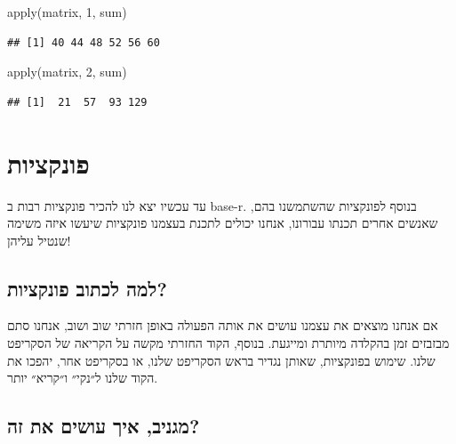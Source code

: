 \documentclass[
]{book}
\newenvironment{Shaded}{\begin{snugshade}}{\end{snugshade}}
\newcommand{\DecValTok}[1]{\textcolor[rgb]{0.00,0.00,0.81}{#1}}
\newcommand{\FunctionTok}[1]{\textcolor[rgb]{0.00,0.00,0.00}{#1}}
\newcommand{\NormalTok}[1]{#1}
\begin{document}
\begin{Shaded}
\begin{Highlighting}[]
\FunctionTok{apply}\NormalTok{(matrix, }\DecValTok{1}\NormalTok{, sum)}
\end{Highlighting}
\end{Shaded}

\begin{verbatim}
## [1] 40 44 48 52 56 60
\end{verbatim}

\begin{Shaded}
\begin{Highlighting}[]
\FunctionTok{apply}\NormalTok{(matrix, }\DecValTok{2}\NormalTok{, sum)}
\end{Highlighting}
\end{Shaded}

\begin{verbatim}
## [1]  21  57  93 129
\end{verbatim}

\hypertarget{ux5e4ux5d5ux5e0ux5e7ux5e6ux5d9ux5d5ux5ea}{%
\chapter{פונקציות}\label{ux5e4ux5d5ux5e0ux5e7ux5e6ux5d9ux5d5ux5ea}}

עד עכשיו יצא לנו להכיר פונקציות רבות ב
base-r.
בנוסף לפונקציות שהשתמשנו בהם, שאנשים אחרים תכנתו עבורונו, אנחנו יכולים לתכנת בעצמנו פונקציות שיעשו איזה משימה שנטיל עליהן!

\hypertarget{ux5dcux5deux5d4-ux5dcux5dbux5eaux5d5ux5d1-ux5e4ux5d5ux5e0ux5e7ux5e6ux5d9ux5d5ux5ea}{%
\section{למה לכתוב פונקציות?}\label{ux5dcux5deux5d4-ux5dcux5dbux5eaux5d5ux5d1-ux5e4ux5d5ux5e0ux5e7ux5e6ux5d9ux5d5ux5ea}}

אם אנחנו מוצאים את עצמנו עושים את אותה הפעולה באופן חזרתי שוב ושוב, אנחנו סתם מבזבזים זמן בהקלדה מיותרת ומייגעת. בנוסף, הקוד החזרתי מקשה על הקריאה של הסקריפט שלנו. שימוש בפונקציות, שאותן נגדיר בראש הסקריפט שלנו, או בסקריפט אחר, יהפכו את הקוד שלנו ל״נקי״ ו״קריא״ יותר.

\hypertarget{ux5deux5d2ux5e0ux5d9ux5d1-ux5d0ux5d9ux5da-ux5e2ux5d5ux5e9ux5d9ux5dd-ux5d0ux5ea-ux5d6ux5d4}{%
\section{מגניב, איך עושים את זה?}\label{ux5deux5d2ux5e0ux5d9ux5d1-ux5d0ux5d9ux5da-ux5e2ux5d5ux5e9ux5d9ux5dd-ux5d0ux5ea-ux5d6ux5d4}}
\end{document}

